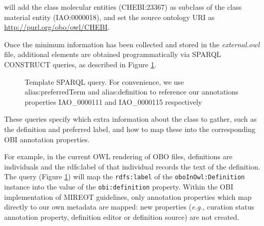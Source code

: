 \documentclass[a4paper,10pt,twocolumn]{article}
\begin{document}
will add the class molecular entities (CHEBI:23367) as subclass of the class material entity (IAO:0000018), and set the source ontology URI as \url{http://purl.org/obo/owl/CHEBI}.

Once the minimum information has been collected  and stored in the \emph{external.owl} file, additional elements are obtained programmatically via SPARQL\cite{RefWorks:1531} CONSTRUCT queries, as described in Figure \ref{fig:sparql}.




\begin{figure}[t]
%  
\scriptsize
 
\caption{Template SPARQL query. For convenience, we use alias:preferredTerm and
alias:definition to reference our annotations properties IAO\_0000111 and IAO\_0000115 respectively}
\label{fig:sparql}
\end{figure}
These queries specify which extra information about the class to gather, such as the definition and preferred label, and how to map these into the corresponding OBI annotation properties. 

For example, in the current \ac{OWL} rendering of \ac{OBO} files, definitions are individuals and the rdfs:label of that individual records the text of the definition. %
The query (Figure \ref{fig:sparql}) will map the \texttt{rdfs:label} of the \texttt{oboInOwl:Definition} instance into the value of the \texttt{obi:definition} property.
Within the \ac{OBI} implementation of \ac{MIREOT} guidelines, only annotation properties which map directly to our own metadata are mapped: new properties (\emph{e.g.}, curation status annotation property, definition editor or definition source) are not created.

\end{document}
